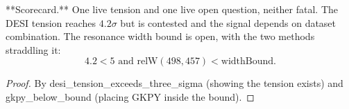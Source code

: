\begin{theorem}
**Scorecard.** One live tension and one live open question, neither fatal.  The DESI tension reaches $4.2\sigma$ but is contested and the signal depends on dataset combination.  The resonance width bound is open, with the two methods straddling it:
\begin{equation}
4.2 < 5 \text{ and } \text{relW}(498, 457) < \text{widthBound}.
\end{equation}
\begin{proof}
By desi\_tension\_exceeds\_three\_sigma (showing the tension exists) and gkpy\_below\_bound (placing GKPY inside the bound).
\end{proof}
\end{theorem}

